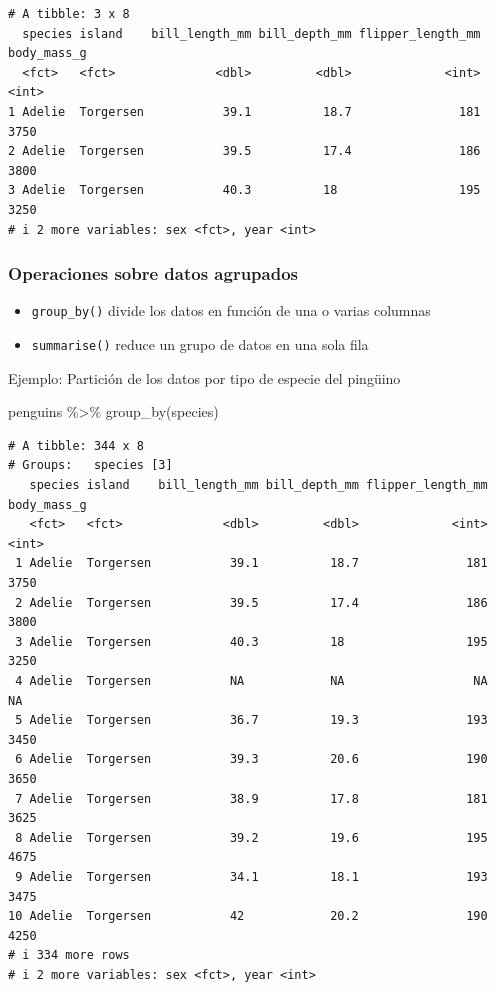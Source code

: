 \documentclass[
  letterpaper,
  DIV=11,
  numbers=noendperiod]{scrreprt}
\newenvironment{Shaded}{\begin{snugshade}}{\end{snugshade}}
\newcommand{\FunctionTok}[1]{\textcolor[rgb]{0.28,0.35,0.67}{#1}}
\newcommand{\NormalTok}[1]{\textcolor[rgb]{0.00,0.23,0.31}{#1}}
\newcommand{\SpecialCharTok}[1]{\textcolor[rgb]{0.37,0.37,0.37}{#1}}
\begin{document}
\begin{verbatim}
# A tibble: 3 x 8
  species island    bill_length_mm bill_depth_mm flipper_length_mm body_mass_g
  <fct>   <fct>              <dbl>         <dbl>             <int>       <int>
1 Adelie  Torgersen           39.1          18.7               181        3750
2 Adelie  Torgersen           39.5          17.4               186        3800
3 Adelie  Torgersen           40.3          18                 195        3250
# i 2 more variables: sex <fct>, year <int>
\end{verbatim}

\subsubsection{\texorpdfstring{\textbf{Operaciones sobre datos
agrupados}}{Operaciones sobre datos agrupados}}\label{operaciones-sobre-datos-agrupados}

\begin{itemize}
\item
  \texttt{group\_by()} divide los datos en función de una o varias
  columnas
\item
  \texttt{summarise()} reduce un grupo de datos en una sola fila
\end{itemize}

{Ejemplo}: Partición de los datos por tipo de especie del pingüino

\begin{Shaded}
\begin{Highlighting}[]
\NormalTok{penguins }\SpecialCharTok{\%\textgreater{}\%} \FunctionTok{group\_by}\NormalTok{(species)}
\end{Highlighting}
\end{Shaded}

\begin{verbatim}
# A tibble: 344 x 8
# Groups:   species [3]
   species island    bill_length_mm bill_depth_mm flipper_length_mm body_mass_g
   <fct>   <fct>              <dbl>         <dbl>             <int>       <int>
 1 Adelie  Torgersen           39.1          18.7               181        3750
 2 Adelie  Torgersen           39.5          17.4               186        3800
 3 Adelie  Torgersen           40.3          18                 195        3250
 4 Adelie  Torgersen           NA            NA                  NA          NA
 5 Adelie  Torgersen           36.7          19.3               193        3450
 6 Adelie  Torgersen           39.3          20.6               190        3650
 7 Adelie  Torgersen           38.9          17.8               181        3625
 8 Adelie  Torgersen           39.2          19.6               195        4675
 9 Adelie  Torgersen           34.1          18.1               193        3475
10 Adelie  Torgersen           42            20.2               190        4250
# i 334 more rows
# i 2 more variables: sex <fct>, year <int>
\end{verbatim}
\end{document}
